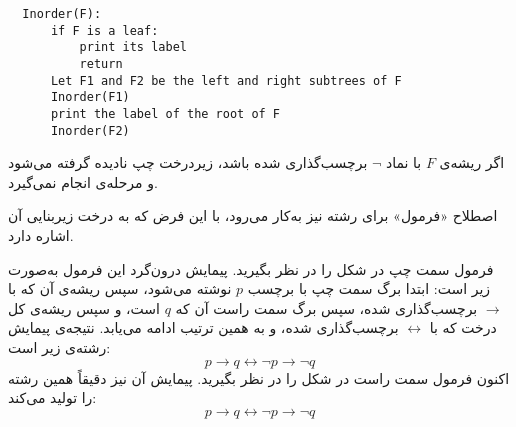   \begin{latin}
  \begin{verbatim}
  Inorder(F):
      if F is a leaf:
          print its label
          return
      Let F1 and F2 be the left and right subtrees of F
      Inorder(F1)
      print the label of the root of F
      Inorder(F2)
  \end{verbatim}
  \end{latin}
  اگر ریشه‌ی $F$ با نماد $\neg$ برچسب‌گذاری شده باشد، زیر‌درخت چپ نادیده گرفته می‌شود و مرحله‌ی  انجام نمی‌گیرد.
  \begin{definition}[تعریف \lr{2.5}]
  اصطلاح «فرمول» برای رشته نیز به‌کار می‌رود، با این فرض که به درخت زیربنایی آن اشاره دارد.
  \end{definition}
  \begin{example}[مثال \lr{2.6}]
  فرمول سمت چپ در شکل  را در نظر بگیرید. پیمایش درون‌گرد این فرمول به‌صورت زیر است: ابتدا برگ سمت چپ با برچسب $p$ نوشته می‌شود، سپس ریشه‌ی آن که با $\rightarrow$ برچسب‌گذاری شده، سپس برگ سمت راست آن که $q$ است، و سپس ریشه‌ی کل درخت که با $\leftrightarrow$ برچسب‌گذاری شده، و به همین ترتیب ادامه می‌یابد. نتیجه‌ی پیمایش رشته‌ی زیر است:
  \[
  p \rightarrow q \leftrightarrow \neg p \rightarrow \neg q
  \]
  اکنون فرمول سمت راست در شکل  را در نظر بگیرید. پیمایش آن نیز دقیقاً همین رشته را تولید می‌کند:
  \[
  p \rightarrow q \leftrightarrow \neg p \rightarrow \neg q
  \]
  \end{example}